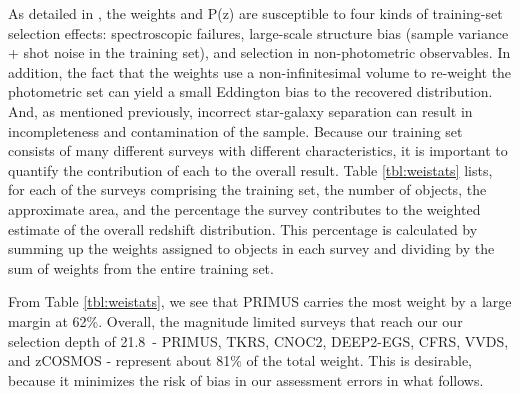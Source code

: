 \documentclass{emulateapj}
\newcommand{\rmax}{21.8}
\begin{document}
As detailed in \cite{CunhaPhotoz09}, the weights and P(z) are susceptible to
four kinds of training-set selection effects: spectroscopic failures,
large-scale structure bias (sample variance + shot noise in the training set),
and selection in non-photometric observables.  In addition, the fact that the
weights use a non-infinitesimal volume to re-weight the photometric set can
yield a small Eddington bias to the recovered distribution.  And, as mentioned
previously, incorrect star-galaxy separation can result in incompleteness and
contamination of the sample.  Because our training set consists of many
different surveys with different characteristics, it is important to quantify
the contribution of each to the overall result.  Table \ref{tbl:weistats}
lists, for each of the surveys comprising the training set, the number of
objects, the approximate area, and the percentage the survey contributes to the
weighted estimate of the overall redshift distribution.  This percentage is
calculated by summing up the weights assigned to objects in each survey and
dividing by the sum of weights from the entire training set.


From Table \ref{tbl:weistats}, we see that PRIMUS carries the most weight by a
large margin at 62\%.  Overall, the magnitude limited surveys that reach our
our selection depth of \rmax\ - PRIMUS, TKRS, CNOC2, DEEP2-EGS, CFRS, VVDS, and
zCOSMOS - represent about 81$\%$ of the total weight.  This is desirable,
because it minimizes the risk of bias in our assessment errors in what follows.
\end{document}
